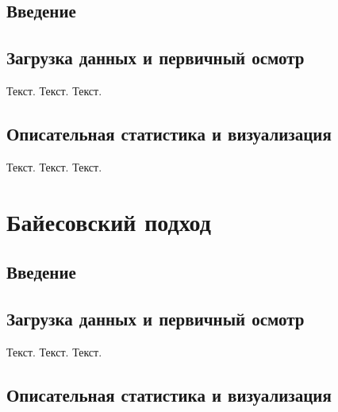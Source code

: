 \documentclass[
  letterpaper,
  DIV=11,
  numbers=noendperiod]{scrreprt}
\begin{document}
\section{Введение}\label{ux432ux432ux435ux434ux435ux43dux438ux435-4}

\section{Загрузка данных и первичный
осмотр}\label{ux437ux430ux433ux440ux443ux437ux43aux430-ux434ux430ux43dux43dux44bux445-ux438-ux43fux435ux440ux432ux438ux447ux43dux44bux439-ux43eux441ux43cux43eux442ux440-3}

Текст. Текст. Текст.

\section{Описательная статистика и
визуализация}\label{ux43eux43fux438ux441ux430ux442ux435ux43bux44cux43dux430ux44f-ux441ux442ux430ux442ux438ux441ux442ux438ux43aux430-ux438-ux432ux438ux437ux443ux430ux43bux438ux437ux430ux446ux438ux44f-3}

Текст. Текст. Текст.


\chapter{Байесовский
подход}\label{ux431ux430ux439ux435ux441ux43eux432ux441ux43aux438ux439-ux43fux43eux434ux445ux43eux434}

\section{Введение}\label{ux432ux432ux435ux434ux435ux43dux438ux435-5}

\section{Загрузка данных и первичный
осмотр}\label{ux437ux430ux433ux440ux443ux437ux43aux430-ux434ux430ux43dux43dux44bux445-ux438-ux43fux435ux440ux432ux438ux447ux43dux44bux439-ux43eux441ux43cux43eux442ux440-4}

Текст. Текст. Текст.

\section{Описательная статистика и
визуализация}\label{ux43eux43fux438ux441ux430ux442ux435ux43bux44cux43dux430ux44f-ux441ux442ux430ux442ux438ux441ux442ux438ux43aux430-ux438-ux432ux438ux437ux443ux430ux43bux438ux437ux430ux446ux438ux44f-4}
\end{document}
